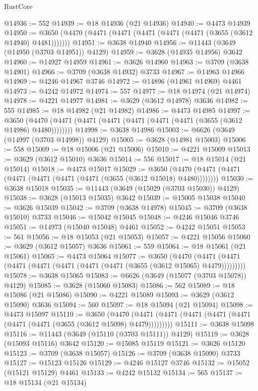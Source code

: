 \begin{lexlean}{RustCore}
\begin{coremodule}
@14936 := 552
@14939 := @18 @14936 (@21 @14936)
@14940 := @4473 @14939
@14950 := @3650 (@4470 (@4471 (@4471 (@4471 (@4471 (@4471 (@3655 (@3612 @14940) @4481)))))))
@14951 := @3638 @14940
@14956 := @11443 (@3649 (@14950 (@3703 @14951)) @4129)
@14959 := @3628 (@14935 @14956) @3642
@14960 := @14927 @14959
@14961 := @3626 @14960
@14963 := @3709 (@3638 @14901)
@14966 := @3709 (@3638 @14932) @3733
@14967 := @14963 @14966
@14969 := @4246 @14967 @3746
@14972 := @14896 (@14961 @14969) @4461
@14973 := @4242 @14972
@14974 := 557
@14977 := @18 @14974 (@21 @14974)
@14978 := @4221 @14977
@14981 := @3629 (@3612 @14978) @3636
@14982 := 555
@14985 := @18 @14982 (@21 @14982)
@14986 := @4473 @14985
@14997 := @3650 (@4470 (@4471 (@4471 (@4471 (@4471 (@4471 (@4471 (@3655 (@3612 @14986) @4480))))))))
@14998 := @3638 @14986
@15003 := @6626 (@3649 (@14997 (@3703 @14998)) @4129)
@15005 := @3628 (@14981 @15003)
@15006 := 558
@15009 := @18 @15006 (@21 @15006)
@15010 := @4221 @15009
@15013 := @3629 (@3612 @15010) @3636
@15014 := 556
@15017 := @18 @15014 (@21 @15014)
@15018 := @4473 @15017
@15029 := @3650 (@4470 (@4471 (@4471 (@4471 (@4471 (@4471 (@4471 (@3655 (@3612 @15018) @4480))))))))
@15030 := @3638 @15018
@15035 := @11443 (@3649 (@15029 (@3703 @15030)) @4129)
@15038 := @3628 (@15013 @15035) @3642
@15039 := @15005 @15038
@15040 := @3626 @15039
@15042 := @3709 (@3638 @14978)
@15045 := @3709 (@3638 @15010) @3733
@15046 := @15042 @15045
@15048 := @4246 @15046 @3746
@15051 := @14973 (@15040 @15048) @4461
@15052 := @4242 @15051
@15053 := 561
@15056 := @18 @15053 (@21 @15053)
@15057 := @4221 @15056
@15060 := @3629 (@3612 @15057) @3636
@15061 := 559
@15064 := @18 @15061 (@21 @15061)
@15065 := @4473 @15064
@15077 := @3650
    (@4470 (@4471 (@4471 (@4471 (@4471 (@4471 (@4471 (@4471 (@3655 (@3612 @15065) @4479)))))))))
@15078 := @3638 @15065
@15083 := @6626 (@3649 (@15077 (@3703 @15078)) @4129)
@15085 := @3628 (@15060 @15083)
@15086 := 562
@15089 := @18 @15086 (@21 @15086)
@15090 := @4221 @15089
@15093 := @3629 (@3612 @15090) @3636
@15094 := 560
@15097 := @18 @15094 (@21 @15094)
@15098 := @4473 @15097
@15110 := @3650
    (@4470 (@4471 (@4471 (@4471 (@4471 (@4471 (@4471 (@4471 (@3655 (@3612 @15098) @4479)))))))))
@15111 := @3638 @15098
@15116 := @11443 (@3649 (@15110 (@3703 @15111)) @4129)
@15119 := @3628 (@15093 @15116) @3642
@15120 := @15085 @15119
@15121 := @3626 @15120
@15123 := @3709 (@3638 @15057)
@15126 := @3709 (@3638 @15090) @3733
@15127 := @15123 @15126
@15129 := @4246 @15127 @3746
@15132 := @15052 (@15121 @15129) @4461
@15133 := @4242 @15132
@15134 := 565
@15137 := @18 @15134 (@21 @15134)

\end{coremodule}
\end{lexlean}
